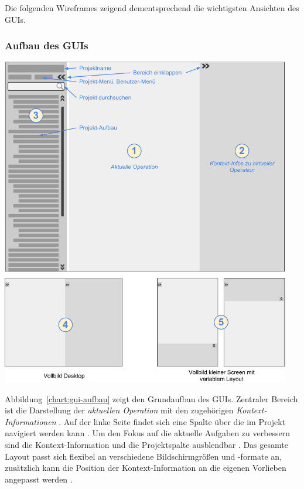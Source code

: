 \bigskip

Die folgenden Wireframes zeigend dementsprechend die wichtigsten Ansichten des GUIs.

\subsubsection{Aufbau des GUIs}

\begin{center}
\includegraphics[width=0.95\textwidth]{media/GUIAufbau.pdf}
\label{chart:gui-aufbau}
\end{center}

Abbildung~\ref{chart:gui-aufbau} zeigt den Grundaufbau des GUIs. Zentraler Bereich ist die Darstellung der \emph{aktuellen Operation}  mit den zugehörigen \emph{Kontext-Informationen} . Auf der linke Seite findet sich eine Spalte über die im Projekt navigiert werden kann . Um den Fokus auf die aktuelle Aufgaben zu verbessern sind die Kontext-Information und die Projektspalte ausblendbar . Das gesamte Layout passt sich flexibel an verschiedene Bildschirmgrößen und -formate an, zusätzlich kann die Position der Kontext-Information an die eigenen Vorlieben angepasst werden .

